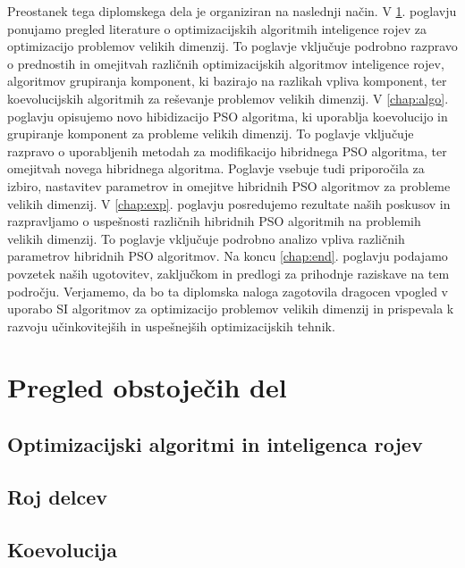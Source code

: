 Preostanek tega diplomskega dela je organiziran na naslednji način.
V \ref{chap:obsojeca.dela}. poglavju ponujamo pregled literature o optimizacijskih algoritmih inteligence rojev za optimizacijo problemov velikih dimenzij.
To poglavje vključuje podrobno razpravo o prednostih in omejitvah različnih optimizacijskih algoritmov inteligence rojev, algoritmov grupiranja komponent, ki bazirajo na razlikah vpliva komponent, ter koevolucijskih algoritmih za reševanje problemov velikih dimenzij.
V \ref{chap:algo}. poglavju opisujemo novo hibidizacijo PSO algoritma, ki uporablja koevolucijo in grupiranje komponent za probleme velikih dimenzij.
To poglavje vključuje razpravo o uporabljenih metodah za modifikacijo hibridnega PSO algoritma, ter omejitvah novega hibridnega algoritma.
Poglavje vsebuje tudi priporočila za izbiro, nastavitev parametrov in omejitve hibridnih PSO algoritmov za probleme velikih dimenzij.
V \ref{chap:exp}. poglavju posredujemo rezultate naših poskusov in razpravljamo o uspešnosti različnih hibridnih PSO algoritmih na problemih velikih dimenzij.
To poglavje vključuje podrobno analizo vpliva različnih parametrov hibridnih PSO algoritmov.
Na koncu \ref{chap:end}. poglavju podajamo povzetek naših ugotovitev, zaključkom in predlogi za prihodnje raziskave na tem področju. Verjamemo, da bo ta diplomska naloga zagotovila dragocen vpogled v uporabo SI algoritmov za optimizacijo problemov velikih dimenzij in prispevala k razvoju učinkovitejših in uspešnejših optimizacijskih tehnik.

\chapter{Pregled obstoječih del}\label{chap:obsojeca.dela}


\section{Optimizacijski algoritmi in inteligenca rojev}


\section{Roj delcev}


\section{Koevolucija}

